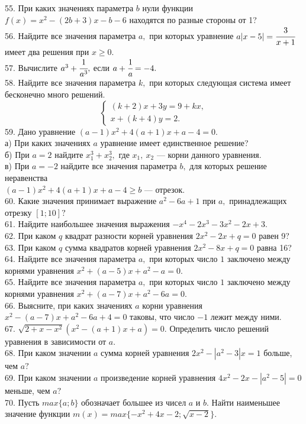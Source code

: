55. При каких значениях параметра $b$ нули функции $f(x)=x^2-(2b+3)x-b-6$ находятся по разные стороны от 1?\\
56. Найдите все значения параметра $a,$ при которых уравнение $a|x-5|=\cfrac{3}{x+1}$ имеет два решения при $x\geqslant 0.$\\
57. Вычислите $a^3+\cfrac{1}{a^3},$ если $a+\cfrac{1}{a}=-4.$\\
58. Найдите все значения параметра $k,$ при которых следующая система имеет бесконечно много решений.
$$\begin{cases}
(k+2)x+3y=9+kx,\\
x+(k+4)y=2.
\end{cases}
$$
59. Дано уравнение $(a-1)x^2+4(a+1)x+a-4=0.$\\
а) При каких значениях $a$ уравнение имеет единственное решение?\\
б) При $a=2$ найдите $x_1^3+x_2^3,$ где $x_1,\ x_2$ --- корни данного уравнения.\\
в) При $a=-2$ найдите все значения параметра $b,$ для которых решение неравенства\\ $(a-1)x^2+4(a+1)x+a-4\geqslant b$ --- отрезок.\\
60. Какие значения принимает выражение $a^2-6a+1$ при $a,$ принадлежащих отрезку $[1;10]?$\\
61. Найдите наибольшее значения выражения $-x^4-2x^3-3x^2-2x+3.$\\
62. При каком $q$ квадрат разности корней уравнения $2x^2-2x+q=0$ равен 9?\\
63. При каком $q$ сумма квадратов корней уравнения $2x^2-8x+q=0$ равна 16?\\
64. Найдите все значения параметра $a,$ при которых число $1$ заключено между корнями уравнения $x^2+(a-5)x+a^2-a=0.$\\
65. Найдите все значения параметра $a,$ при которых число $1$ заключено между корнями уравнения $x^2+(a-7)x+a^2-6a=0.$\\
66. Выясните, при каких значениях $a$ корни уравнения $x^2-(a-7)x+a^2-6a+4=0$ таковы, что число $-1$ лежит между ними.\\
67. $\sqrt{2+x-x^2}(x^2-(a+1)x+a)=0.$ Определить число решений уравнения в зависимости от $a.$\\
68. При каком значении $a$ сумма корней уравнения $2x^2-|a^2-3|x=1$ больше, чем $a?$\\
69. При каком значении $a$ произведение корней уравнения $4x^2-2x-|a^2-5|=0$ меньше, чем $a?$\\
70. Пусть $max\{a;b\}$ обозначает большее из чисел $a$ и $b.$ Найти наименьшее значение функции $m(x)=max\{-x^2+4x-2; \sqrt{x-2}\}.$\\
